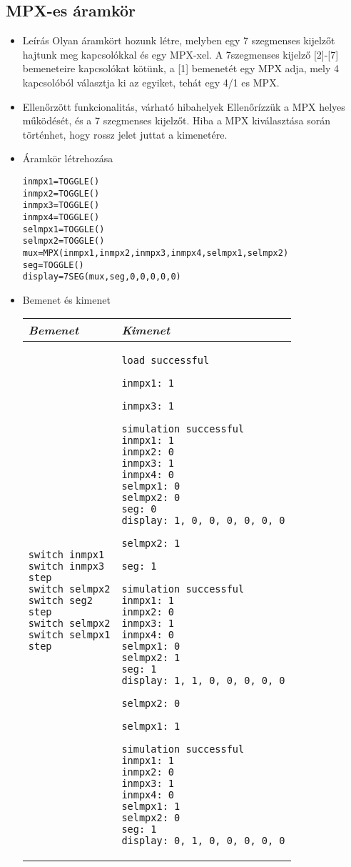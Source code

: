\subsection{MPX-es áramkör}
\begin{itemize}
\item Leírás\newline
Olyan áramkört hozunk létre, melyben egy 7 szegmenses kijelzőt hajtunk meg kapcsolókkal és egy MPX-xel. A 7szegmenses kijelző [2]-[7] bemeneteire kapcsolókat kötünk, a [1] bemenetét egy MPX adja, mely 4 kapcsolóból választja ki az egyiket, tehát egy 4/1 es MPX.
\item Ellenőrzött funkcionalitás, várható hibahelyek\newline
Ellenőrízzük a MPX helyes működését, és a 7 szegmenses kijelzőt. Hiba a MPX kiválasztása során történhet, hogy rossz jelet juttat a kimenetére.

\item Áramkör létrehozása

\begin{verbatim}
inmpx1=TOGGLE()
inmpx2=TOGGLE()
inmpx3=TOGGLE()
inmpx4=TOGGLE()
selmpx1=TOGGLE()
selmpx2=TOGGLE()
mux=MPX(inmpx1,inmpx2,inmpx3,inmpx4,selmpx1,selmpx2)
seg=TOGGLE()
display=7SEG(mux,seg,0,0,0,0,0)
\end{verbatim}

\item Bemenet és kimenet\newline

\begin{tabular}{|p{7cm}|p{7cm}|} 
\hline 
\textit{Bemenet} & \textit{Kimenet} \\ \hline
\begin{verbatim}
switch inmpx1
switch inmpx3
step
switch selmpx2
switch seg2
step
switch selmpx2
switch selmpx1
step
\end{verbatim}
& 
\begin{verbatim}
load successful

inmpx1: 1

inmpx3: 1

simulation successful
inmpx1: 1
inmpx2: 0
inmpx3: 1
inmpx4: 0
selmpx1: 0
selmpx2: 0
seg: 0
display: 1, 0, 0, 0, 0, 0, 0

selmpx2: 1

seg: 1

simulation successful
inmpx1: 1
inmpx2: 0
inmpx3: 1
inmpx4: 0
selmpx1: 0
selmpx2: 1
seg: 1
display: 1, 1, 0, 0, 0, 0, 0

selmpx2: 0

selmpx1: 1

simulation successful
inmpx1: 1
inmpx2: 0
inmpx3: 1
inmpx4: 0
selmpx1: 1
selmpx2: 0
seg: 1
display: 0, 1, 0, 0, 0, 0, 0

\end{verbatim}
\\ \hline
\end{tabular}

\end{itemize}

